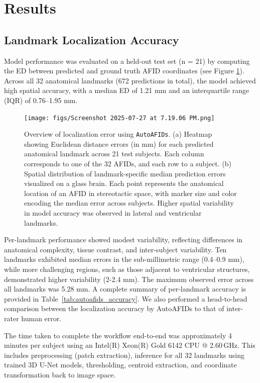 \section{Results}
\subsection{Landmark Localization Accuracy}
Model performance was evaluated on a held-out test set (n = 21) by computing the ED between predicted and ground truth AFID coordinates (see Figure \ref{fig:ch3_Figure_autoscore}). Across all 32 anatomical landmarks (672 predictions in total), the model achieved high spatial accuracy, with a median ED of 1.21 mm and an interquartile range (IQR) of 0.76–1.95 mm. 

\begin{figure}[hbt!]
    \centering
    \texttt{[image: figs/Screenshot 2025-07-27 at 7.19.06 PM.png]}
    \caption{Overview of localization error using \texttt{AutoAFIDs}. (a) Heatmap showing Euclidean distance errors (in mm) for each predicted anatomical landmark across 21 test subjects. Each column corresponds to one of the 32 AFIDs, and each row to a subject. (b) Spatial distribution of landmark-specific median prediction errors visualized on a glass brain. Each point represents the anatomical location of an AFID in stereotactic space, with marker size and color encoding the median error across subjects. Higher spatial variability in model accuracy was observed in lateral and ventricular landmarks.}
    \label{fig:ch3_Figure_autoscore}
\end{figure}

Per-landmark performance showed modest variability, reflecting differences in anatomical complexity, tissue contrast, and inter-subject variability. Ten landmarks exhibited median errors in the sub-millimetric range (0.4–0.9 mm), while more challenging regions, such as those adjacent to ventricular structures, demonstrated higher variability (2-2.4 mm). The maximum observed error across all landmarks was 5.28 mm. A complete summary of per-landmark accuracy is provided in Table~\ref{tab:autoafids_accuracy}. We also performed a head-to-head comparison between the localization accuracy by AutoAFIDs to that of inter-rater human error.

The time taken to complete the workflow end-to-end was approximately 4 minutes per subject using an Intel(R) Xeon(R) Gold 6142 CPU @ 2.60\,GHz. This includes preprocessing (patch extraction), inference for all 32 landmarks using trained 3D U-Net models, thresholding, centroid extraction, and coordinate transformation back to image space.


